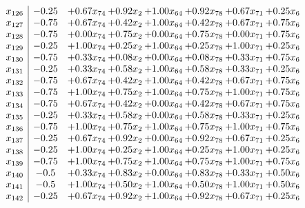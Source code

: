 \documentclass[8pt]{article}
\begin{document}
\[\begin{array}{c| c c@{\hskip 2pt} c@{\hskip 2pt} c@{\hskip 2pt} c@{\hskip 2pt} c@{\hskip 2pt} c@{\hskip 2pt} }
 x_{126}   &  -0.25 & +  0.67 x_{74} & +  0.92 x_{2} & +  1.00 x_{64} & +  0.92 x_{78} & +  0.67 x_{71} & +  0.25 x_{6}\\
 x_{127}   &  -0.75 & +  0.67 x_{74} & +  0.42 x_{2} & +  1.00 x_{64} & +  0.42 x_{78} & +  0.67 x_{71} & +  0.75 x_{6}\\
 x_{128}   &  -0.75 & +  0.00 x_{74} & +  0.75 x_{2} & +  0.00 x_{64} & +  0.75 x_{78} & +  0.00 x_{71} & +  0.75 x_{6}\\
 x_{129}   &  -0.25 & +  1.00 x_{74} & +  0.25 x_{2} & +  1.00 x_{64} & +  0.25 x_{78} & +  1.00 x_{71} & +  0.25 x_{6}\\
 x_{130}   &  -0.75 & +  0.33 x_{74} & +  0.08 x_{2} & +  0.00 x_{64} & +  0.08 x_{78} & +  0.33 x_{71} & +  0.75 x_{6}\\
 x_{131}   &  -0.25 & +  0.33 x_{74} & +  0.58 x_{2} & +  1.00 x_{64} & +  0.58 x_{78} & +  0.33 x_{71} & +  0.25 x_{6}\\
 x_{132}   &  -0.75 & +  0.67 x_{74} & +  0.42 x_{2} & +  1.00 x_{64} & +  0.42 x_{78} & +  0.67 x_{71} & +  0.75 x_{6}\\
 x_{133}   &  -0.75 & +  1.00 x_{74} & +  0.75 x_{2} & +  1.00 x_{64} & +  0.75 x_{78} & +  1.00 x_{71} & +  0.75 x_{6}\\
 x_{134}   &  -0.75 & +  0.67 x_{74} & +  0.42 x_{2} & +  0.00 x_{64} & +  0.42 x_{78} & +  0.67 x_{71} & +  0.75 x_{6}\\
 x_{135}   &  -0.25 & +  0.33 x_{74} & +  0.58 x_{2} & +  0.00 x_{64} & +  0.58 x_{78} & +  0.33 x_{71} & +  0.25 x_{6}\\
 x_{136}   &  -0.75 & +  1.00 x_{74} & +  0.75 x_{2} & +  1.00 x_{64} & +  0.75 x_{78} & +  1.00 x_{71} & +  0.75 x_{6}\\
 x_{137}   &  -0.25 & +  0.67 x_{74} & +  0.92 x_{2} & +  0.00 x_{64} & +  0.92 x_{78} & +  0.67 x_{71} & +  0.25 x_{6}\\
 x_{138}   &  -0.25 & +  1.00 x_{74} & +  0.25 x_{2} & +  1.00 x_{64} & +  0.25 x_{78} & +  1.00 x_{71} & +  0.25 x_{6}\\
 x_{139}   &  -0.75 & +  1.00 x_{74} & +  0.75 x_{2} & +  1.00 x_{64} & +  0.75 x_{78} & +  1.00 x_{71} & +  0.75 x_{6}\\
 x_{140}   &  -0.5 & +  0.33 x_{74} & +  0.83 x_{2} & +  0.00 x_{64} & +  0.83 x_{78} & +  0.33 x_{71} & +  0.50 x_{6}\\
 x_{141}   &  -0.5 & +  1.00 x_{74} & +  0.50 x_{2} & +  1.00 x_{64} & +  0.50 x_{78} & +  1.00 x_{71} & +  0.50 x_{6}\\
 x_{142}   &  -0.25 & +  0.67 x_{74} & +  0.92 x_{2} & +  1.00 x_{64} & +  0.92 x_{78} & +  0.67 x_{71} & +  0.25 x_{6}\\

\end{array}\]
\end{document}
